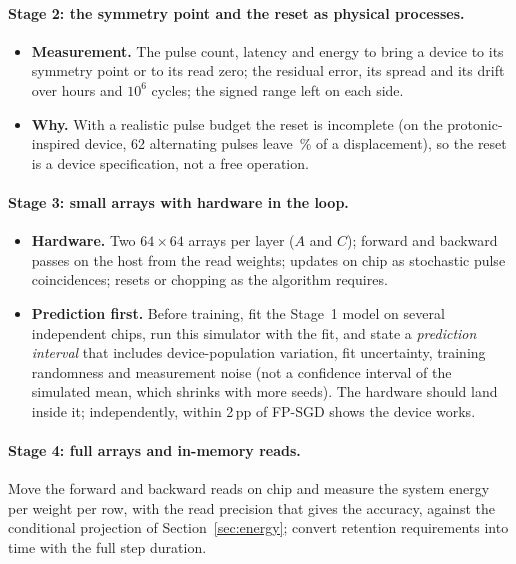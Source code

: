 \paragraph{Stage 2: the symmetry point and the reset as physical processes.}
\begin{itemize}
\item \textbf{Measurement.} The pulse count, latency and energy to bring a device to its symmetry point or to its read zero; the
      residual error, its spread and its drift over hours and $10^6$ cycles; the signed range left on each side.
\item \textbf{Why.} With a realistic pulse budget the reset is incomplete (on the protonic-inspired device, 62 alternating
      pulses leave \RVresetResidPct\,\% of a displacement), so the reset is a device specification, not a free operation.
\end{itemize}

\paragraph{Stage 3: small arrays with hardware in the loop.}
\begin{itemize}
\item \textbf{Hardware.} Two $64\times64$ arrays per layer ($A$ and $C$); forward and backward passes on the host from the read
      weights; updates on chip as stochastic pulse coincidences; resets or chopping as the algorithm requires.
\item \textbf{Prediction first.} Before training, fit the Stage~1 model on several independent chips, run this simulator with
      the fit, and state a \emph{prediction interval} that includes device-population variation, fit uncertainty, training
      randomness and measurement noise (not a confidence interval of the simulated mean, which shrinks with more seeds). The
      hardware should land inside it; independently, within 2\,pp of FP-SGD shows the device works.
\end{itemize}

\paragraph{Stage 4: full arrays and in-memory reads.} Move the forward and backward reads on chip and measure the system energy
per weight per row, with the read precision that gives the accuracy, against the conditional projection of
Section~\ref{sec:energy}; convert retention requirements into time with the full step duration.

